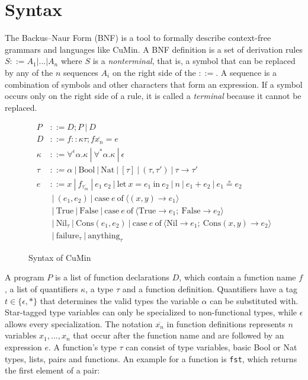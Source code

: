 \documentclass[paper = a4, fleqn, abstract=on, twoside]{scrreprt}
\begin{document}
\section{Syntax}
The Backus–Naur Form (BNF) is a tool to formally describe context-free grammars and languages like CuMin. A BNF definition is a set of derivation rules $S ::= A_{1} | \dots | A_{n} $ where $S$ is a \textit{nonterminal}, that is, a symbol that can be replaced by any of the $n$ sequences $A_{i}$ on the right side of the $::=$. A sequence is a combination of symbols and other characters that form an expression. If a symbol occurs only on the right side of a rule, it is called a \textit{terminal} because it cannot be replaced.
\begin{figure}[H]
	\begin{align*}
	P &::= D;P \:|\:D \\
	D &::= f :: \kappa \tau; f \overline{x_{n}} = e\\
	\kappa &::= \forall^{\epsilon} \alpha.\kappa \:|\: \forall^{*}\alpha.\kappa \:|\: \epsilon \\
	\tau &::= \alpha \:|\: \text{Bool} \:|\: \text{Nat} \:|\: [\tau] \:|\: (\tau,\tau ') \:|\: \tau \rightarrow \tau ' \\
	e &::= x \:|\: f_{\overline{\tau_{m}}} \:|\: e_{1}\: e_{2} \:|\: \text{let}\: x = e_{1} \:\text{in}\: e_{2} \:|\: n \:|\: e_{1} + e_{2} \:|\: e_{1} \circeq e_{2}\\
	&\:|\: (e_{1},e_{2}) \:|\: \text{case}\: e \:\text{of}\: \langle (x,y) \rightarrow e_{1}\rangle\\
	&\:|\: \text{True} \:|\: \text{False} \:|\: \text{case}\: e \:\text{of}\: \langle \text{True} \rightarrow e_{1};\:\text{False} \rightarrow e_{2}\rangle\\
	&\:|\: \text{Nil}_{\tau} \:|\: \text{Cons}(e_{1}, e_{2}) \:|\: \text{case}\: e \:\text{of}\: \langle \text{Nil} \rightarrow e_{1};\:\text{Cons}(x,y) \rightarrow e_{2}\rangle\\
	&\:|\: \text{failure}_{\tau} \:|\: \text{anything}_{\tau}
	\end{align*}
	\caption{Syntax of CuMin}
	\label{cumin:syntax}
\end{figure}\noindent
A program $P$ is a list of function declarations $D$, which contain a function name $f$, a list of quantifiers $\kappa$, a type $\tau$ and a function definition. Quantifiers have a tag $t \in \{\epsilon, *\}$ that determines the valid types the variable $\alpha$ can be substituted with. Star-tagged type variables can only be specialized to non-functional types, while $\epsilon$ allows every specialization. The notation $\overline{x_{n}}$ in function definitions represents $n$ variables $x_{1},...,x_{n}$ that occur after the function name and are followed by an expression $e$. A function's type $\tau$ can consist of type variables, basic Bool or Nat types, lists, pairs and functions. An example for a function is \texttt{fst}, which returns the first element of a pair:
\end{document}
